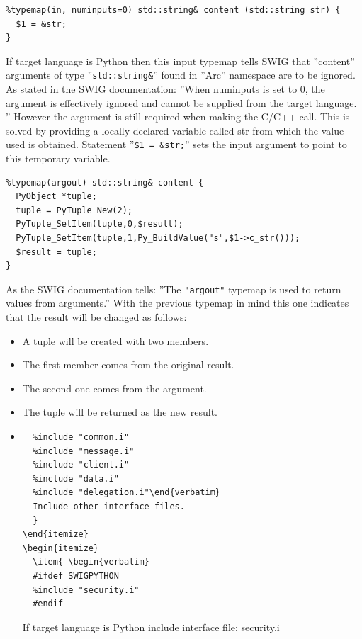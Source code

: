 \documentclass{article}
\begin{document}
\begin{flushleft}
\begin{itemize}
{\begin{verbatim}
%typemap(in, numinputs=0) std::string& content (std::string str) { 
  $1 = &str; 
}
\end{verbatim}
  If target language is Python then this input typemap tells SWIG that ''content'' 
  arguments of type ''\verb$std::string&$'' found in ''Arc'' namespace are to be ignored. 
  As stated in the SWIG documentation: ''When numinputs is set to 0, the argument is 
  effectively ignored and cannot be supplied from the target language. '' 
  However the argument is still required when making the C/C++ call. This is solved 
  by providing a locally declared variable called str from which the value used is 
  obtained. Statement ''\verb#$1 = &str;#'' sets the input argument to point to this 
  temporary variable.
\begin{verbatim}
%typemap(argout) std::string& content { 
  PyObject *tuple; 
  tuple = PyTuple_New(2); 
  PyTuple_SetItem(tuple,0,$result); 
  PyTuple_SetItem(tuple,1,Py_BuildValue("s",$1->c_str())); 
  $result = tuple; 
} 
\end{verbatim}
  As the SWIG documentation tells: ''The \verb$"argout"$ typemap is used to return values from arguments.''
  With the previous typemap in mind this one indicates that the result will be changed as follows:
    \begin{itemize}
    \item{
      A tuple will be created with two members.
    }
    \item{
      The first member comes from the original result.
    }
    \item{
      The second one comes from the argument.
    }
    \item{
      The tuple will be returned as the new result.
    }
    \end{itemize}
  }
\end{itemize}
\begin{itemize}
  \item{
\begin{verbatim}
  %include "common.i"
  %include "message.i"
  %include "client.i"
  %include "data.i"
  %include "delegation.i"\end{verbatim}
  Include other interface files.
  }
\end{itemize}
\begin{itemize}
  \item{ \begin{verbatim}
  #ifdef SWIGPYTHON
  %include "security.i"
  #endif\end{verbatim}
  If target language is Python include interface file: security.i
  }
\end{itemize}
\end{flushleft}
\end{document}
